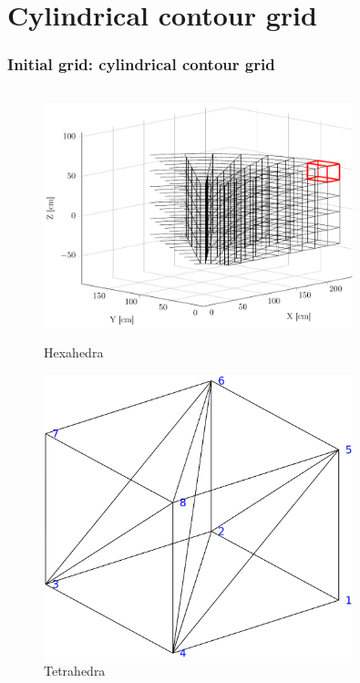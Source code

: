 \documentclass{beamer}
\begin{document}
\section{Cylindrical contour grid}
\begin{frame}
\frametitle{Initial grid: cylindrical contour grid}
\vspace{-1.5 cm}
\begin{columns}[onlytextwidth]
	\begin{column}{0.45\textwidth}
		\begin{center}
			\begin{figure}
				\includegraphics[trim={0 1cm 0 2cm},clip,width=0.8\textwidth]{FIGURES/3d_grid_sketch_torus.pdf}
				\caption{Hexahedra}
				\includegraphics[trim={0 3cm 0cm 2cm},clip,width=0.8\textwidth]{FIGURES/Tetra_split.eps}
				\caption{Tetrahedra}
			\end{figure}
		\end{center}

\end{column}
\end{columns}
\end{frame}
\end{document}
